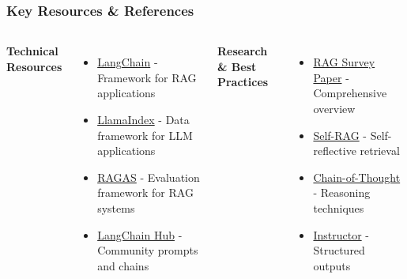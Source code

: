 \begin{frame}
    \frametitle{Key Resources \& References}
    
    \begin{center}
    \end{center}
    
    \begin{columns}
        \textbf{Technical Resources}
        \begin{itemize}
            \item \href{https://github.com/langchain-ai/langchain}{LangChain} - Framework for RAG applications
            \item \href{https://github.com/run-llama/llama_index}{LlamaIndex} - Data framework for LLM applications
            \item \href{https://github.com/microsoft/RAGAS}{RAGAS} - Evaluation framework for RAG systems
            \item \href{https://github.com/hwchase17/langchain-hub}{LangChain Hub} - Community prompts and chains
        \end{itemize}
        
        \textbf{Research \& Best Practices}
        \begin{itemize}
            \item \href{https://arxiv.org/abs/2312.10997}{RAG Survey Paper} - Comprehensive overview
            \item \href{https://arxiv.org/abs/2310.11511}{Self-RAG} - Self-reflective retrieval
            \item \href{https://arxiv.org/abs/2302.04761}{Chain-of-Thought} - Reasoning techniques
            \item \href{https://jxnl.github.io/instructor/}{Instructor} - Structured outputs
        \end{itemize}
    \end{columns}
    
    \vspace{0.3cm}
    \begin{center}
    \end{center}
\end{frame} 